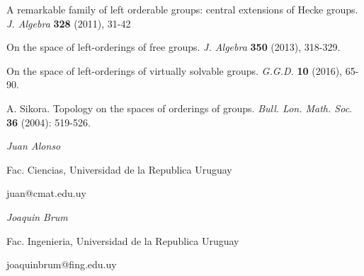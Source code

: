 \documentclass[12pt]{article}
\theoremstyle{definition}
\begin{document}
\begin{small}
\begin{thebibliography}{Dillo 83}
 A remarkable family of left orderable groups: central extensions of Hecke groups. {\em J. Algebra} {\bf 328} (2011), 31-42

 On the space of left-orderings of free groups. {\em J. Algebra} {\bf 350} (2013), 318-329.

 On the space of left-orderings of virtually solvable groups. {\em G.G.D.} {\bf 10} (2016),  65-90.

 {\sc A. Sikora.}
Topology on the spaces of orderings of groups.
{\em Bull. Lon. Math. Soc}. {\bf 36} (2004): 519-526.

\end{thebibliography}

\textit{Juan Alonso}

Fac. Ciencias, Universidad de la Republica Uruguay

juan@cmat.edu.uy

\bigskip

\textit{Joaquin Brum}

Fac. Ingenieria, Universidad de la Republica Uruguay

joaquinbrum@fing.edu.uy

\end{small}
\end{document}

